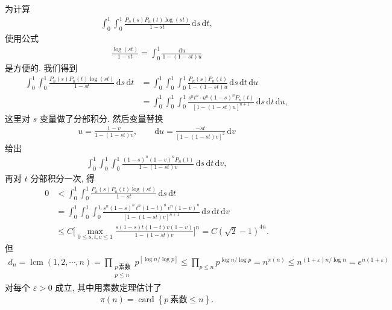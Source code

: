 为计算
\begin{align*}
  \int_{0}^{1}\int_{0}^{1}\frac{P_{n}(s)P_{n}(t)\log(s t)}{1-s t}\,\mathrm{d}s\,\mathrm{d}t,
\end{align*}
使用公式
\begin{align*}
  \frac{\log(st)}{1-st}=\int_{0}^{1}\frac{\mathrm{d}u}{1-(1-st)u}
\end{align*}
是方便的. 我们得到
\begin{align*}
  \int_{0}^{1}\int_{0}^{1}\frac{P_{n}(s)P_{n}(t)\log(st)}{1-st}\,\mathrm{d}s\,\mathrm{d}t
  &=\int_{0}^{1}\int_{0}^{1}\int_{0}^{1}\frac{P_{n}(s)P_{n}(t)}{1-(1-st)u}\,\mathrm{d}s\,\mathrm{d}t\,\mathrm{d}u\\
  &=\int_{0}^{1}\int_{0}^{1}\int_{0}^{1}
   \frac{s^{n}t^{n}\cdot u^{n}(1-s)^{n}P_{n}(t)}{[1-(1-st)u]^{n+1}}\,\mathrm{d}s\,\mathrm{d}t\,\mathrm{d}u,
\end{align*}
这里对 $s$ 变量做了分部积分. 然后变量替换
\begin{align*}
  u=\frac{1-v}{1-(1-s t)v},\qquad
  \mathrm{d}u=\frac{-s t}{[1-(1-s t)v]^{2}}\,\mathrm{d}v
\end{align*}
给出
\begin{align*}
  \int_{0}^{1}\int_{0}^{1}\int_{0}^{1}
  \frac{(1-s)^{n}(1-v)^{n}P_{n}(t)}{1-(1-st)v}\,\mathrm{d}s\,\mathrm{d}t\,\mathrm{d}v,
\end{align*}
再对 $t$ 分部积分一次, 得
\begin{align*}
  0&<\int_{0}^{1}\int_{0}^{1}\frac{P_{n}(s)P_{n}(t)\log(st)}{1-st}\,\mathrm{d}s\,\mathrm{d}t\\
  &=\int_{0}^{1}\int_{0}^{1}\int_{0}^{1}
   \frac{s^{n}(1-s)^{n}\, t^{n}(1-t)^{n}\, v^{n}(1-v)^{n}}{[1-(1-st)v]^{n+1}}\,\mathrm{d}s\,\mathrm{d}t\,\mathrm{d}v\\
  &\leq C\Big[\max_{0\leq s,t,v\leq 1}
   \frac{s(1-s)t(1-t)v(1-v)}{1-(1-st)v}\Big]^{n}
   =C\left(\sqrt{2}-1\right)^{4n}.
\end{align*}
但
\begin{align*}
  d_{n}=\operatorname{lcm}(1,2,\cdots,n)
  =\prod_{\substack{p\,\text{素数}\\ p\leq n}}p^{\left\lbrack\log n/\log p\right\rbrack}
  \leq\prod_{p\leq n}p^{\log n/\log p}=n^{\pi(n)}
  \leq n^{(1+\varepsilon)n/\log n}=e^{n(1+\varepsilon)}
\end{align*}
对每个 $\varepsilon > 0$ 成立, 其中用素数定理估计了
\begin{align*}
  \pi(n)=\operatorname{card}\left\{p\ \text{素数}\leq n\right\}.
\end{align*}

